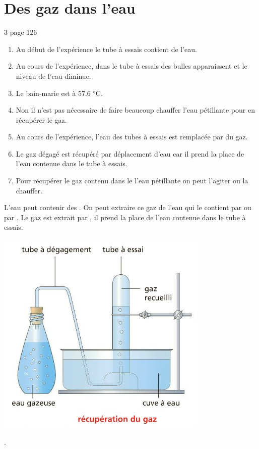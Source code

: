 \documentclass[12pt,a4paper]{article}
\begin{document}
\section{Des gaz dans l'eau}

\begin{myact}{3 page 126}
	\begin{enumerate}
		\item Au début de l'expérience le tube à essais contient de l'eau.
		\item Au cours de l'expérience, dans le tube à essais des bulles apparaissent et le niveau de l'eau diminue.
		\item Le bain-marie est à \num{57.6} °C.
		\item Non il n'est pas nécessaire de faire beaucoup chauffer l'eau pétillante pour en récupérer le gaz.
		\item Au cours de l'expérience, l'eau des tubes à essais est remplacée par du gaz.
		\item Le gaz dégagé est récupéré par déplacement d'eau car il prend la place de l'eau contenue dans le tube à essais.
		\item Pour récupérer le gaz contenu dans le l'eau pétillante on peut l'agiter  ou la chauffer.
	\end{enumerate}
\end{myact}

\begin{mybilan}
	\begin{multicols*}{2}
				
		L'eau peut contenir des . On peut extraire ce gaz de l'eau qui le contient par 	 ou par . Le gaz est extrait par , il prend la place de l'eau contenue dans le tube à essais.
		
		\includegraphics[scale=0.4]{img/recueilgaz}
	
\end{multicols*}.
\end{mybilan}
\end{document}

